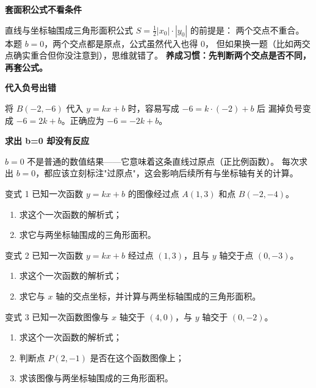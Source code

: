 \documentclass{exam-zh}
\newcommand{\eduSubTitle}[1]{%
  \needspace{4\baselineskip}%
  \vspace{1mm}
  {\color{edu-blue}\bfseries #1}\par
  \vspace{1mm}
}
\newcommand{\answerarea}[1][40mm]{%
  \vspace{3mm}%
  \begin{tcolorbox}[
    enhanced,
    breakable,
    colback=white,
    colframe=edu-line,
    boxrule=0.55pt,
    arc=0.8mm,
    height=#1,
    valign=top,
  ]
  \end{tcolorbox}%
}
\begin{document}
\begin{eduMistakeBox}
\eduSubTitle{套面积公式不看条件}直线与坐标轴围成三角形面积公式 $S = \frac{1}{2}|x_0| \cdot |y_0|$ 的前提是：
两个交点不重合。本题 $b = 0$，两个交点都是原点，公式虽然代入也得 $0$，
但如果换一题（比如两交点确实重合但你没注意到），思维就错了。
\textbf{养成习惯：先判断两个交点是否不同，再套公式。}
\end{eduMistakeBox}




\begin{eduMistakeBox}
\eduSubTitle{代入负号出错}将 $B(-2, -6)$ 代入 $y = kx + b$ 时，容易写成 $-6 = k \cdot (-2) + b$ 后
漏掉负号变成 $-6 = 2k + b$。正确应为 $-6 = -2k + b$。
\end{eduMistakeBox}




\begin{eduMistakeBox}
\eduSubTitle{求出 b=0 却没有反应}$b = 0$ 不是普通的数值结果——它意味着这条直线过原点（正比例函数）。
每次求出 $b = 0$，都应该立刻标注"过原点"，这会影响后续所有与坐标轴有关的计算。
\end{eduMistakeBox}




\begin{eduVariationTraining}{变式 1}
已知一次函数 $y=kx+b$ 的图像经过点 $A(1,3)$ 和点 $B(-2,-4)$。
\begin{enumerate}[label=(\arabic*)]
  \item 求这个一次函数的解析式；
  \item 求它与两坐标轴围成的三角形面积。
\end{enumerate}

\answerarea[36mm]
\end{eduVariationTraining}




\begin{eduVariationTraining}{变式 2}
已知一次函数 $y=kx+b$ 经过点 $(1,3)$，且与 $y$ 轴交于点 $(0,-3)$。
\begin{enumerate}[label=(\arabic*)]
  \item 求这个一次函数的解析式；
  \item 求它与 $x$ 轴的交点坐标，并计算与两坐标轴围成的三角形面积。
\end{enumerate}

\answerarea[40mm]
\end{eduVariationTraining}




\begin{eduVariationTraining}{变式 3}
已知一次函数图像与 $x$ 轴交于 $(4,0)$，与 $y$ 轴交于 $(0,-2)$。
\begin{enumerate}[label=(\arabic*)]
  \item 求这个一次函数的解析式；
  \item 判断点 $P(2,-1)$ 是否在这个函数图像上；
  \item 求该图像与两坐标轴围成的三角形面积。
\end{enumerate}

\answerarea[42mm]
\end{eduVariationTraining}
\end{document}
